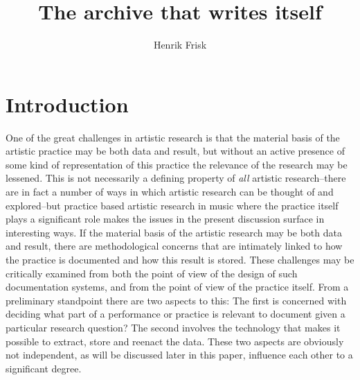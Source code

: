 \documentclass[11pt,a4paper]{article}
\author{Henrik Frisk}
\title{The archive that writes itself}
\begin{document}
\maketitle

\section*{Introduction}
\label{sec:introduction}
\noindent
One of the great challenges in artistic research is that the material basis of the artistic practice may be both data and result, but without an active presence of some kind of representation of this practice the relevance of the research may be lessened. This is not necessarily a defining property of \emph{all} artistic research--there are in fact a number of ways in which artistic research can be thought of and explored--but practice based artistic research in music where the practice itself plays a significant role makes the issues in the present discussion surface in interesting ways. If the material basis of the artistic research may be both data and result, there are methodological concerns that are intimately linked to how the practice is documented and how this result is stored. These challenges may be critically examined from both the point of view of the design of such documentation systems, and from the point of view of the practice itself. From a preliminary standpoint there are two aspects to this: The first is concerned with deciding what part of a performance or practice is relevant to document given a particular research question? The second involves the technology that makes it possible to extract, store and reenact the data. These two aspects are obviously not independent, as will be discussed later in this paper, influence each other to a significant degree.
\end{document}
